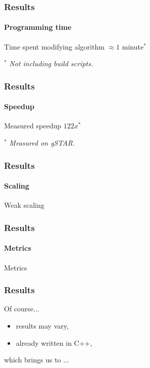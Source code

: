 \documentclass{beamer}
\begin{document}
\begin{frame}
  \frametitle{Results}
  \framesubtitle{Programming time}
  \begin{block}{Time spent modifying algorithm}
    \centering
    \vspace{1cm}
    {\Huge $\approx 1$ minute$^*$}
    \vspace{1cm}
  \end{block}
  $^*$ {\it Not including build scripts.}
\end{frame}

\begin{frame}
  \frametitle{Results}
  \framesubtitle{Speedup}
  \begin{block}{Measured speedup}
    \centering
    \vspace{1cm}
    {\Huge $122x^*$}
    \vspace{1cm}
  \end{block}
  $^*$ {\it Measured on gSTAR.}
\end{frame}

\begin{frame}
  \frametitle{Results}
  \framesubtitle{Scaling}
  \begin{block}{Weak scaling}
    \centering
    \vspace{1cm}
    \vspace{1cm}
  \end{block}
\end{frame}

\begin{frame}
  \frametitle{Results}
  \framesubtitle{Metrics}
  \begin{block}{Metrics}
    \vspace{1cm}
    \hspace{0.5cm}{\Huge $x5$ per character changed.} \\
    \hspace{0.5cm}{\Huge $x2$ per second spent.}
    \vspace{1cm}
  \end{block}
\end{frame}

\begin{frame}
  \frametitle{Results}
  {\Huge Of course...} \\
  \vspace{.5cm}
  \begin{itemize}
    \item results may vary,
    \item already written in C++,
  \end{itemize}
  \vspace{.5cm}
  which brings us to ...
\end{frame}
\end{document}

